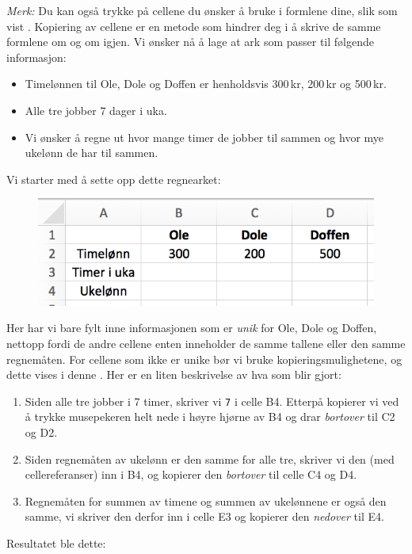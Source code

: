 \textsl{Merk:} Du kan også trykke på cellene du ønsker å bruke i formlene dine, slik som vist .
Kopiering av cellene er en metode som hindrer deg i å skrive de samme formlene om og om igjen. Vi ønsker nå å lage at ark som passer til følgende informasjon:
\begin{itemize}
	\item Timelønnen til Ole, Dole og Doffen er henholdsvis 300\,kr, 200\,kr og 500\,kr.
	\item Alle tre jobber 7 dager i uka.
	\item Vi ønsker å regne ut hvor mange timer de jobber til sammen og hvor mye ukelønn de har til sammen.
\end{itemize}

Vi starter med å sette opp dette regnearket:
\begin{figure}[H]
	\centering
	\includegraphics[scale=0.3]{figs/ex7}\qquad
\end{figure}
Her har vi bare fylt inne informasjonen som er \textit{unik} for Ole, Dole og Doffen, nettopp fordi de andre cellene enten inneholder de samme tallene eller den samme regnemåten. For cellene som ikke er unike bør vi bruke kopieringsmulighetene, og dette vises i denne . Her er en liten beskrivelse av hva som blir gjort:
\begin{enumerate}
	\item Siden alle tre jobber i 7 timer, skriver vi {\tt 7} i celle B4. Etterpå kopierer vi ved å trykke musepekeren helt nede i høyre hjørne av B4 og drar \textsl{bortover} til C2 og D2.
	\item Siden regnemåten av ukelønn er den samme for alle tre, skriver vi den (med cellereferanser) inn i B4, og kopierer den \textsl{bortover} til celle C4 og D4.
	\item Regnemåten for summen av timene og summen av ukelønnene er også den samme, vi skriver den derfor inn i celle E3 og kopierer den \textsl{nedover} til E4.
\end{enumerate}
Resultatet ble dette:
